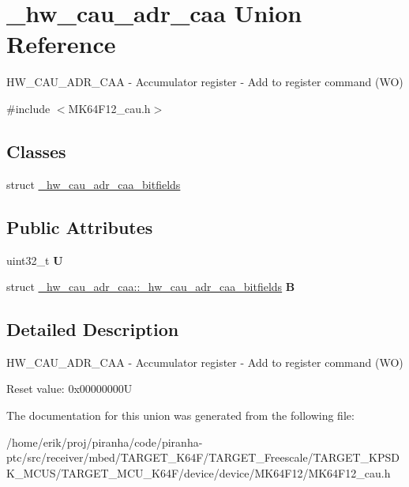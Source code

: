 \hypertarget{union__hw__cau__adr__caa}{}\section{\+\_\+hw\+\_\+cau\+\_\+adr\+\_\+caa Union Reference}
\label{union__hw__cau__adr__caa}


H\+W\+\_\+\+C\+A\+U\+\_\+\+A\+D\+R\+\_\+\+C\+AA -\/ Accumulator register -\/ Add to register command (WO)  




{\ttfamily \#include $<$M\+K64\+F12\+\_\+cau.\+h$>$}

\subsection*{Classes}
\begin{DoxyCompactItemize}
\item 
struct \hyperlink{struct__hw__cau__adr__caa_1_1__hw__cau__adr__caa__bitfields}{\+\_\+hw\+\_\+cau\+\_\+adr\+\_\+caa\+\_\+bitfields}
\end{DoxyCompactItemize}
\subsection*{Public Attributes}
\begin{DoxyCompactItemize}
\item 
uint32\+\_\+t {\bfseries U}\hypertarget{union__hw__cau__adr__caa_ad7e4b76e8b19220a522567e34994074d}{}\label{union__hw__cau__adr__caa_ad7e4b76e8b19220a522567e34994074d}

\item 
struct \hyperlink{struct__hw__cau__adr__caa_1_1__hw__cau__adr__caa__bitfields}{\+\_\+hw\+\_\+cau\+\_\+adr\+\_\+caa\+::\+\_\+hw\+\_\+cau\+\_\+adr\+\_\+caa\+\_\+bitfields} {\bfseries B}\hypertarget{union__hw__cau__adr__caa_aed5646ffd1b141cddbd8db6d0f072393}{}\label{union__hw__cau__adr__caa_aed5646ffd1b141cddbd8db6d0f072393}

\end{DoxyCompactItemize}


\subsection{Detailed Description}
H\+W\+\_\+\+C\+A\+U\+\_\+\+A\+D\+R\+\_\+\+C\+AA -\/ Accumulator register -\/ Add to register command (WO) 

Reset value\+: 0x00000000U 

The documentation for this union was generated from the following file\+:\begin{DoxyCompactItemize}
\item 
/home/erik/proj/piranha/code/piranha-\/ptc/src/receiver/mbed/\+T\+A\+R\+G\+E\+T\+\_\+\+K64\+F/\+T\+A\+R\+G\+E\+T\+\_\+\+Freescale/\+T\+A\+R\+G\+E\+T\+\_\+\+K\+P\+S\+D\+K\+\_\+\+M\+C\+U\+S/\+T\+A\+R\+G\+E\+T\+\_\+\+M\+C\+U\+\_\+\+K64\+F/device/device/\+M\+K64\+F12/M\+K64\+F12\+\_\+cau.\+h\end{DoxyCompactItemize}
